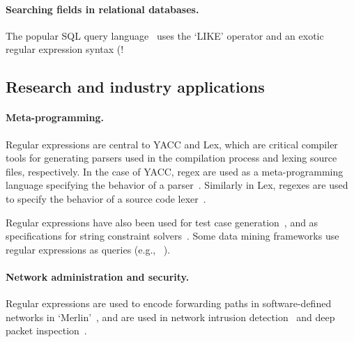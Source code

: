 \paragraph{Searching fields in relational databases.}  The popular SQL query language~ uses the `LIKE' operator and an exotic regular expression syntax (\bverb!%


\subsection{Research and industry applications}
\paragraph{Meta-programming.}  Regular expressions are central to YACC and Lex, which are critical compiler tools for generating parsers used in the compilation process and lexing source files, respectively.  In the case of YACC, regex are used as a meta-programming language specifying the behavior of a parser~.  Similarly in Lex, regexes are used to specify the behavior of a source code lexer~.

Regular expressions have also been used for test case generation~,  and as specifications for string constraint solvers~.  Some data mining frameworks use regular expressions as queries (e.g., ~).

\paragraph{Network administration and security.} Regular expressions are used to encode forwarding paths in software-defined networks in `Merlin'~, and are used in network intrusion detection~ and deep packet inspection~.

